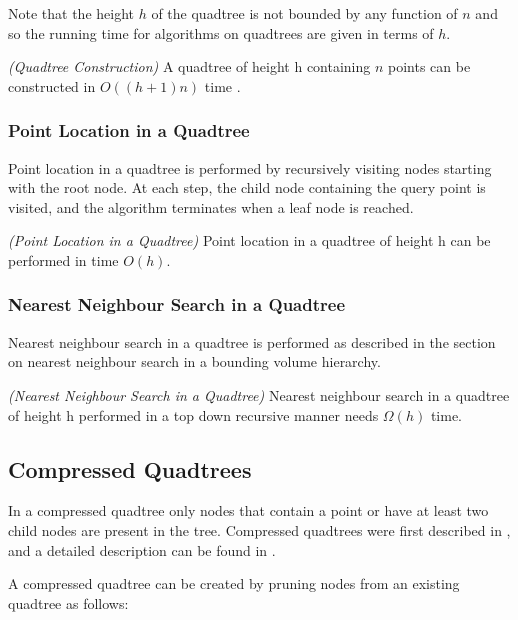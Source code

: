 \documentclass[mcs]{scsthesis}
\begin{document}
Note that the height $h$ of the quadtree is not bounded by any function of $n$
and so the running time for algorithms on quadtrees are given in terms of $h$.

\begin{thm} \emph{(Quadtree Construction)}
A quadtree of height h containing $n$ points can be constructed in \(O((h + 1)n)\)
time \cite{dutch}.
\end{thm}

\subsubsection{Point Location in a Quadtree}

Point location in a quadtree is performed by recursively visiting nodes
starting with the root node. At each step, the child node containing the query
point is visited, and the algorithm terminates when a leaf node is reached.

\begin{thm} \emph{(Point Location in a Quadtree)} 
Point location in a quadtree of height h can be performed in time \(O(h)\). 
\end{thm}

\subsubsection{Nearest Neighbour Search in a Quadtree}

Nearest neighbour search in a quadtree is performed as described in the section
on nearest neighbour search in a bounding volume hierarchy.

\begin{thm} \emph{(Nearest Neighbour Search in a Quadtree)} 
Nearest neighbour search in a quadtree of height h performed in a top down
recursive manner needs \(\Omega(h)\) time.
\end{thm}

\subsection{Compressed Quadtrees}

In a compressed quadtree only nodes that contain a point or have at least two
child nodes are present in the tree. Compressed quadtrees were first described
in \cite{compressedquadtree}, and a detailed description can be found in
\cite{skipquadtree}.

A compressed quadtree can be created by pruning nodes from an existing quadtree
as follows:
\end{document}
